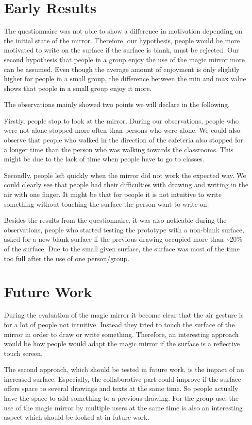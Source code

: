 \documentclass{sigchi-ext}
\begin{document}
\section{Early Results}
The questionnaire was not able to show a difference in motivation depending on the initial state of the mirror. Therefore, our hypothesis, people would be more motivated to write on the surface if the surface is blank, must be rejected. Our second hypothesis that people in a group enjoy the use of the magic mirror more can be assumed. Even though the average amount of enjoyment is only slightly higher for people in a small group, the difference between the min and max value shows that people in a small group enjoy it more.

The observations mainly showed two points we will declare in the following. 

 Firstly, people stop to look at the mirror. During our observations, people who were not alone stopped more often than persons who were alone. We could also observe that people who walked in the direction of the cafeteria also stopped for a longer time than the person who was walking towards the classrooms. This might be due to the lack of time when people have to go to classes.

Secondly, people left quickly when the mirror did not work the expected way. We could clearly see that people had their difficulties with drawing and writing in the air with one finger. It might be that for people it is not intuitive to write something without touching the surface the person want to write on.

Besides the results from the questionnaire, it was also noticable during the observations, people who started testing the prototype with a non-blank surface, asked for a new blank surface if the previous drawing occupied more than \textasciitilde20\% of the surface. Due to the small given surface, the surface was most of the time too full after the use of one person/group.

\section{Future Work}
During the evaluation of the magic mirror it become clear that the air gesture is for a lot of people not intuitive. Instead they tried to touch the surface of the mirror in order to draw or write something. Therefore, an interesting approach would be how people would adapt the magic mirror if the surface is a reflective touch screen.

The second approach, which should be tested in future work, is the impact of an increased surface. Especially, the collaborative part could improve if the surface offers space to several drawings and texts at the same time. So people actually have the space to add something to a previous drawing. For the group use, the use of the magic mirror by multiple users at the same time is also an interesting aspect which should be looked at in future work.


\balance{} 



\end{document}
